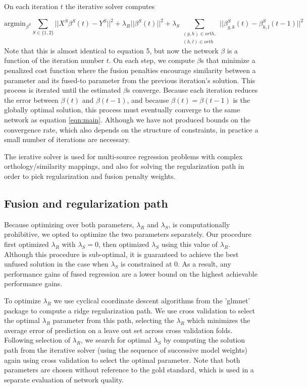 \documentclass[11pt]{article}
\begin{document}
On each iteration $t$ the iterative solver computes

\begin{equation}
\text{argmin}_{\beta^{S}} \displaystyle\sum_{S \in \{1, 2\}} ||X^{S}\beta^{S}(t) - Y^{S}||^2 + \lambda_R||\beta^{S}(t)||^2 + \lambda_S\displaystyle \sum_{\substack{(g,h) \in orth,\\
 (h,l) \in orth}} ||\beta^{S}_{g,k}(t) - \beta_{h,l}^{S}(t-1)||^2
\end{equation}
Note that this is almost identical to equation 5, but now the network $\beta$ is a function of the iteration number $t$. On each step, we compute $\beta$s that minimize a penalized cost function where the fusion penalties encourage similarity between a parameter and its fused-to parameter from the previous iteration's solution. This process is iterated until the estimated $\beta$s converge. Because each iteration reduces the error between $\beta(t)$ and $\beta(t-1)$, and because $\beta(t) = \beta(t-1)$ is the globally optimal solution, this process must eventually converge to the same network as equation \ref{eqn:main}. Although we have not produced bounds on the convergence rate, which also depends on the structure of constraints, in practice a small number of iterations are necessary.

The ierative solver is used for multi-source regression problems with complex orthology/similarity mappings, and also for solving the regularization path in order to pick regularization and fusion penalty weights. 

\subsection{Fusion and regularization path}
Because optimizing over both parameters, $\lambda_R$ and $\lambda_S$, is computationally prohibitive, we opted to optimize the two parameters separately. Our procedure first optimized $\lambda_R$ with $\lambda_S=0$, then optimized $\lambda_S$ using this value of $\lambda_R$. Although this procedure is sub-optimal, it is guaranteed to achieve the best unfused solution in the case when $\lambda_S$ is constrained at 0. As a result, any performance gains of fused regression are a lower bound on the highest achievable performance gains. 

To optimize $\lambda_R$ we use cyclical coordinate descent algorithms from the 'glmnet' package \cite{friedman_regularization_2010} to compute a ridge regularization path. We use cross validation to select the optimal $\lambda_R$ parameter from this path, selecting the $\lambda_R$ which minimizes the average error of prediction on a leave out set across cross validation folds. Following selection of $\lambda_R$, we search for optimal $\lambda_S$ by computing the solution path from the iterative solver (using the sequence of successive model weights) again using cross validation to select the optimal parameter. Note that both parameters are chosen without reference to the gold standard, which is used in a separate evaluation of network quality. 
\end{document}
